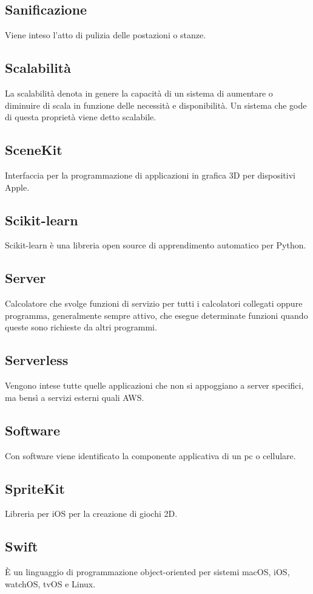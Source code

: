 \subsection{Sanificazione} Viene inteso l'atto di pulizia delle postazioni o stanze.
\subsection{Scalabilità} La scalabilità denota in genere la capacità di un sistema di aumentare o diminuire di scala in funzione delle necessità e disponibilità. Un sistema che gode di questa proprietà viene detto scalabile.
\subsection{SceneKit} Interfaccia per la programmazione di applicazioni in grafica 3D per dispositivi Apple.
\subsection{Scikit-learn} Scikit-learn è una libreria open source di apprendimento automatico per Python.
\subsection{Server} Calcolatore che svolge funzioni di servizio per tutti i calcolatori collegati oppure programma, generalmente sempre attivo, che esegue determinate funzioni quando queste sono richieste da altri programmi.
\subsection{Serverless} Vengono intese tutte quelle applicazioni che non si appoggiano a server specifici, ma bensì a servizi esterni quali AWS.
\subsection{Software} Con software viene identificato la componente applicativa di un pc o cellulare.
\subsection{SpriteKit} Libreria per iOS per la creazione di giochi 2D.
\subsection{Swift} È un linguaggio di programmazione object-oriented per sistemi macOS, iOS, watchOS, tvOS e Linux.
